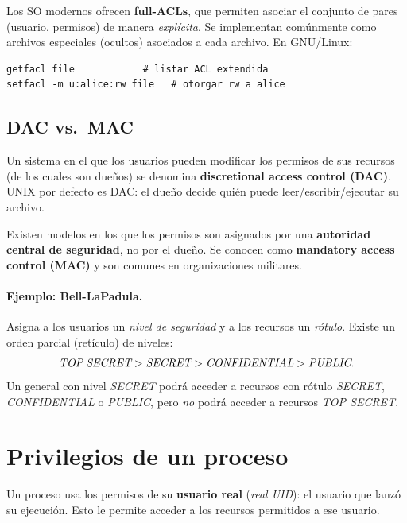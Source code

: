 \documentclass[11pt,a4paper]{article}
\begin{document}
Los SO modernos ofrecen \textbf{full-ACLs}, que permiten asociar el
conjunto de pares (usuario, permisos) de manera \emph{explícita}. Se
implementan comúnmente como archivos especiales (ocultos) asociados a
cada archivo. En GNU/Linux:

\begin{lstlisting}[style=shellstyle]
getfacl file            # listar ACL extendida
setfacl -m u:alice:rw file   # otorgar rw a alice
\end{lstlisting}

\subsection{DAC vs.\ MAC}

\begin{definicion}
Un sistema en el que los usuarios pueden modificar los permisos de sus
recursos (de los cuales son dueños) se denomina \textbf{discretional
access control (DAC)}. UNIX por defecto es DAC: el dueño decide quién
puede leer/escribir/ejecutar su archivo.
\end{definicion}

Existen modelos en los que los permisos son asignados por una
\textbf{autoridad central de seguridad}, no por el dueño. Se conocen
como \textbf{mandatory access control (MAC)} y son comunes en
organizaciones militares.

\paragraph{Ejemplo: Bell-LaPadula.}
Asigna a los usuarios un \emph{nivel de seguridad} y a los recursos
un \emph{rótulo}. Existe un orden parcial (retículo) de niveles:
\[
\textit{TOP\;SECRET} > \textit{SECRET} > \textit{CONFIDENTIAL} > \textit{PUBLIC}.
\]
Un general con nivel \emph{SECRET} podrá acceder a recursos con
rótulo \emph{SECRET}, \emph{CONFIDENTIAL} o \emph{PUBLIC}, pero
\emph{no} podrá acceder a recursos \emph{TOP SECRET}.

\section{Privilegios de un proceso}

Un proceso usa los permisos de su \textbf{usuario real} (\emph{real
UID}): el usuario que lanzó su ejecución. Esto le permite acceder a
los recursos permitidos a ese usuario.
\end{document}
